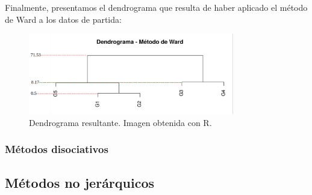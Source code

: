 \begin{ejemplo}
\begin{table}[h]
    \end{table}

    Finalmente, presentamos el dendrograma que resulta de haber aplicado el método de Ward a los datos de partida:

    \begin{figure}[h]
        \centering
        \includegraphics[width=0.8\textwidth]{../img/dendrograma.png}
        \caption{Dendrograma resultante. Imagen obtenida con R.}
    \end{figure}

\end{ejemplo}


\subsubsection{Métodos disociativos}



\subsection{Métodos no jerárquicos}


